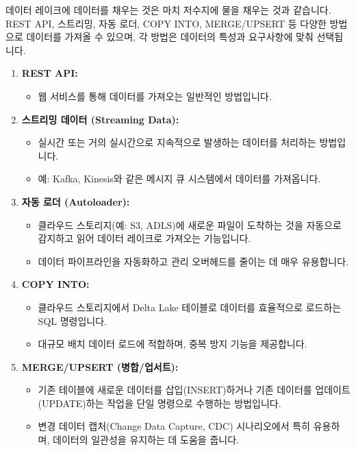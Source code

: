 \documentclass[11pt,a4paper]{article}
\begin{document}
\begin{tcolorbox}[mybox={핵심 요약: 데이터 레이크에 물 채우기}]
데이터 레이크에 데이터를 채우는 것은 마치 저수지에 물을 채우는 것과 같습니다. REST API, 스트리밍, 자동 로더, COPY INTO, MERGE/UPSERT 등 다양한 방법으로 데이터를 가져올 수 있으며, 각 방법은 데이터의 특성과 요구사항에 맞춰 선택됩니다.
\end{tcolorbox}

\begin{enumerate}
    \item \textbf{REST API:}
    \begin{itemize}
        \item 웹 서비스를 통해 데이터를 가져오는 일반적인 방법입니다.
    \end{itemize}
    \item \textbf{스트리밍 데이터 (Streaming Data):}
    \begin{itemize}
        \item 실시간 또는 거의 실시간으로 지속적으로 발생하는 데이터를 처리하는 방법입니다.
        \item 예: Kafka, Kinesis와 같은 메시지 큐 시스템에서 데이터를 가져옵니다.
    \end{itemize}
    \item \textbf{자동 로더 (Autoloader):}
    \begin{itemize}
        \item 클라우드 스토리지(예: S3, ADLS)에 새로운 파일이 도착하는 것을 자동으로 감지하고 읽어 데이터 레이크로 가져오는 기능입니다.
        \item 데이터 파이프라인을 자동화하고 관리 오버헤드를 줄이는 데 매우 유용합니다.
    \end{itemize}
    \item \textbf{COPY INTO:}
    \begin{itemize}
        \item 클라우드 스토리지에서 Delta Lake 테이블로 데이터를 효율적으로 로드하는 SQL 명령입니다.
        \item 대규모 배치 데이터 로드에 적합하며, 중복 방지 기능을 제공합니다.
    \end{itemize}
    \item \textbf{MERGE/UPSERT (병합/업서트):}
    \begin{itemize}
        \item 기존 테이블에 새로운 데이터를 삽입(INSERT)하거나 기존 데이터를 업데이트(UPDATE)하는 작업을 단일 명령으로 수행하는 방법입니다.
        \item 변경 데이터 캡처(Change Data Capture, CDC) 시나리오에서 특히 유용하며, 데이터의 일관성을 유지하는 데 도움을 줍니다.
    \end{itemize}
\end{enumerate}
\end{document}

